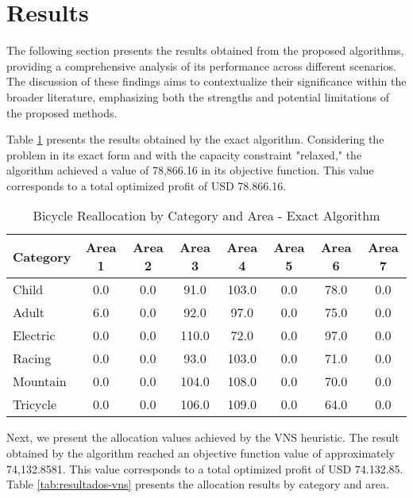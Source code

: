 \documentclass[]{article}
\begin{document}
\section{Results}

The following section presents the results obtained from the proposed algorithms, providing a comprehensive analysis of its performance across different scenarios. The discussion of these findings aims to contextualize their significance within the broader literature, emphasizing both the strengths and potential limitations of the proposed methods.

Table \ref{tab:resultados-exact} presents the results obtained by the exact algorithm. Considering the problem in its exact form and with the capacity constraint "relaxed," the algorithm achieved a value of 78,866.16 in its objective function. This value corresponds to a total optimized profit of USD 78.866.16.

\begin{table}[H]
	\centering
	\begin{tabular}{lccccccc}
		\hline
		\textbf{Category} & \textbf{Area 1} & \textbf{Area 2} & \textbf{Area 3} & \textbf{Area 4} & \textbf{Area 5} & \textbf{Area 6} & \textbf{Area 7} \\
		\hline
		Child    & 0.0  & 0.0  & 91.0  & 103.0 & 0.0  & 78.0  & 0.0  \\
		Adult    & 6.0  & 0.0  & 92.0  & 97.0  & 0.0  & 75.0  & 0.0  \\
		Electric & 0.0  & 0.0  & 110.0 & 72.0  & 0.0  & 97.0  & 0.0  \\
		Racing   & 0.0  & 0.0  & 93.0  & 103.0 & 0.0  & 71.0  & 0.0  \\
		Mountain & 0.0  & 0.0  & 104.0 & 108.0 & 0.0  & 70.0  & 0.0  \\
		Tricycle & 0.0  & 0.0  & 106.0 & 109.0 & 0.0  & 64.0  & 0.0  \\
		\hline
	\end{tabular}
	\caption{Bicycle Reallocation by Category and Area - Exact Algorithm}
	\label{tab:resultados-exact}
\end{table}

Next, we present the allocation values achieved by the VNS heuristic. The result obtained by the algorithm reached an objective function value of approximately 74,132.8581. This value corresponds to a total optimized profit of USD 74.132.85. Table \ref{tab:resultados-vns} presents the allocation results by category and area.
\end{document}
